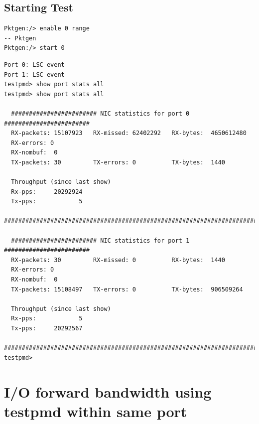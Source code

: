 \documentclass[letter]{article}
\begin{document}
{{\subsection{Starting Test}

\begin{lstlisting}[escapechar=!]
Pktgen:/> enable 0 range
-- Pktgen 
Pktgen:/> start 0
\end{lstlisting}

\begin{lstlisting}
Port 0: LSC event
Port 1: LSC event
testpmd> show port stats all
testpmd> show port stats all

  ######################## NIC statistics for port 0  ########################
  RX-packets: 15107923   RX-missed: 62402292   RX-bytes:  4650612480
  RX-errors: 0
  RX-nombuf:  0         
  TX-packets: 30         TX-errors: 0          TX-bytes:  1440

  Throughput (since last show)
  Rx-pps:     20292924
  Tx-pps:            5
  ############################################################################

  ######################## NIC statistics for port 1  ########################
  RX-packets: 30         RX-missed: 0          RX-bytes:  1440
  RX-errors: 0
  RX-nombuf:  0         
  TX-packets: 15108497   TX-errors: 0          TX-bytes:  906509264

  Throughput (since last show)
  Rx-pps:            5
  Tx-pps:     20292567
  ############################################################################
testpmd> 

\end{lstlisting}

\section{I/O forward bandwidth using testpmd within same port}
{\setlength{\parindent}{0cm}

}}}
\end{document}
